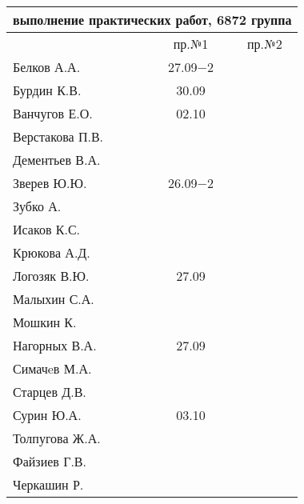 \documentclass[a4paper,11pt]{article}
\begin{document}
\newpage
\begin{tabular}{l|cc}
\multicolumn{3}{c}{выполнение практических работ, 6872 группа} \\
\toprule
& пр.№1 & пр.№2 \\
\midrule
Белков А.А.    &27.09$-2$&     \\   
Бурдин К.В.    &30.09    &     \\
Ванчугов Е.О.  &02.10    &     \\
Верстакова П.В.&         &     \\
Дементьев В.А. &         &     \\
Зверев Ю.Ю.    &26.09$-2$&     \\
Зубко А.       &         &     \\
Исаков К.С.    &         &     \\
Крюкова А.Д.   &         &     \\
Логозяк В.Ю.   &27.09    &     \\
Малыхин С.А.   &         &     \\
Мошкин К.      &         &     \\
Нагорных В.А.  &27.09    &     \\
Симачeв М.А.   &         &     \\
Старцев Д.В.   &         &     \\
Сурин Ю.А.     &03.10    &     \\
Толпугова Ж.А. &         &     \\
Файзиев Г.В.   &         &     \\
Черкашин Р.    &         &     \\
\bottomrule
\end{tabular}
\end{document}
